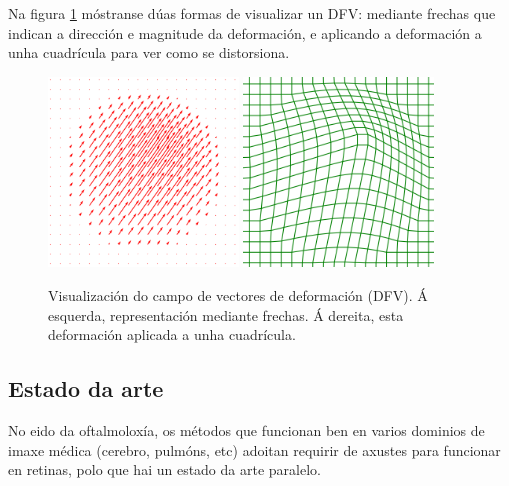Na figura \ref{fig:dfv_visualization} móstranse dúas formas de visualizar un DFV: mediante frechas que indican a dirección e magnitude da deformación, e aplicando a deformación a unha cuadrícula para ver como se distorsiona.

\begin{figure}[ht!]
    \centering
    \includegraphics[width=0.45\textwidth]{imaxes/dfv_arrows.png}
    \includegraphics[width=0.45\textwidth]{imaxes/dfv_grid.png}
    \caption{Visualización do campo de vectores de deformación (DFV). Á esquerda, representación mediante frechas. Á dereita, esta deformación aplicada a unha cuadrícula.}
    \label{fig:dfv_visualization}
\end{figure}

\subsection{Estado da arte}
\label{subsec:Estado da arte}



No eido da oftalmoloxía, os métodos que funcionan ben en varios dominios de imaxe médica (cerebro, pulmóns, etc) adoitan requirir de axustes para funcionar en retinas, polo que hai un estado da arte paralelo. 



